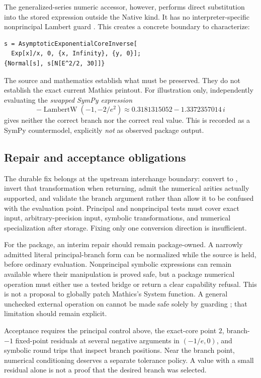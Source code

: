 \documentclass[11pt,a4paper]{article}
\newcommand{\code}[1]{\texttt{\detokenize{#1}}}
\theoremstyle{remark}
\begin{document}
The generalized-series numeric accessor, however, performs direct substitution into the stored expression outside the Native kind. It has no interpreter-specific nonprincipal Lambert guard \cite{core}. This creates a concrete boundary to characterize:
\begin{lstlisting}
s = AsymptoticExponentialCoreInverse[
  Exp[x]/x, 0, {x, Infinity}, {y, 0}];
{Normal[s], s[N[E^2/2, 30]]}
\end{lstlisting}
The source and mathematics establish what must be preserved. They do not establish the exact current Mathics printout. For illustration only, independently evaluating the \emph{swapped SymPy expression}
\[
 -\operatorname{LambertW}(-1,-2/e^2)
 \approx 0.3181315052-1.3372357014\,i
\]
gives neither the correct branch nor the correct real value. This is recorded as a SymPy countermodel, explicitly \emph{not} as observed package output.

\subsection{Repair and acceptance obligations}

The durable fix belongs at the upstream interchange boundary: convert \code{ProductLog[k,z]} to \code{LambertW(z,k)}, invert that transformation when returning, admit the numerical arities actually supported, and validate the branch argument rather than allow it to be confused with the evaluation point. Principal and nonprincipal tests must cover exact input, arbitrary-precision input, symbolic transformations, and numerical specialization after storage. Fixing only one conversion direction is insufficient.

For the package, an interim repair should remain package-owned. A narrowly admitted literal principal-branch form can be normalized while the source is held, before ordinary evaluation. Nonprincipal symbolic expressions can remain available where their manipulation is proved safe, but a package numerical operation must either use a tested bridge or return a clear capability refusal. This is not a proposal to globally patch Mathics's System function. A general unchecked external operation on \code{Normal[s]} cannot be made safe solely by guarding \code{s[value]}; that limitation should remain explicit.

Acceptance requires the principal control above, the exact-core point $2$, branch-$-1$ fixed-point residuals at several negative arguments in $(-1/e,0)$, and symbolic round trips that inspect branch positions. Near the branch point, numerical conditioning deserves a separate tolerance policy. A value with a small residual alone is not a proof that the desired branch was selected.
\end{document}

